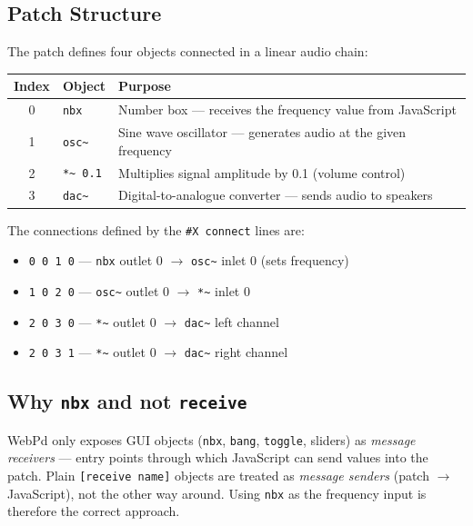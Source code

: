 \documentclass[12pt,a4paper]{article}
\begin{document}
\subsection{Patch Structure}

The patch defines four objects connected in a linear audio chain:

\begin{center}
\begin{tabular}{@{}cll@{}}
\toprule
\textbf{Index} & \textbf{Object} & \textbf{Purpose} \\
\midrule
0 & \texttt{nbx} & Number box — receives the frequency value from JavaScript \\
1 & \texttt{osc\textasciitilde} & Sine wave oscillator — generates audio at the given frequency \\
2 & \texttt{*\textasciitilde{} 0.1} & Multiplies signal amplitude by 0.1 (volume control) \\
3 & \texttt{dac\textasciitilde} & Digital-to-analogue converter — sends audio to speakers \\
\bottomrule
\end{tabular}
\end{center}

The connections defined by the \texttt{\#X connect} lines are:

\begin{itemize}
  \item \texttt{0 0 1 0} — \texttt{nbx} outlet 0 $\rightarrow$ \texttt{osc\textasciitilde} inlet 0 (sets frequency)
  \item \texttt{1 0 2 0} — \texttt{osc\textasciitilde} outlet 0 $\rightarrow$ \texttt{*\textasciitilde} inlet 0
  \item \texttt{2 0 3 0} — \texttt{*\textasciitilde} outlet 0 $\rightarrow$ \texttt{dac\textasciitilde} left channel
  \item \texttt{2 0 3 1} — \texttt{*\textasciitilde} outlet 0 $\rightarrow$ \texttt{dac\textasciitilde} right channel
\end{itemize}

\subsection{Why \texttt{nbx} and not \texttt{receive}}

WebPd only exposes GUI objects (\texttt{nbx}, \texttt{bang}, \texttt{toggle}, sliders) as \emph{message receivers} — entry points through which JavaScript can send values into the patch. Plain \texttt{[receive name]} objects are treated as \emph{message senders} (patch $\rightarrow$ JavaScript), not the other way around. Using \texttt{nbx} as the frequency input is therefore the correct approach.
\end{document}
